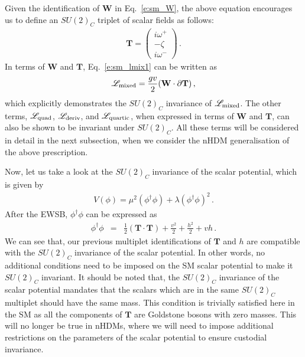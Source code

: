 \documentclass[11pt]{article}
\begin{document}
%
Given the identification of $\mathbf{W}$ in Eq.~\eqref{e:sm_W}, the above equation encourages us to define an $SU(2)_C$ triplet of scalar fields as follows:
%
\begin{eqnarray}
	\label{e:sm_T}
	\textbf{T}=\begin{pmatrix}
		i\omega^+\\-\zeta\\i\omega^-
	\end{pmatrix}\,.
\end{eqnarray}
%
In terms of $\mathbf{W}$ and $\mathbf{T}$, Eq.~\eqref{e:sm_lmix1} can be written as
%
\begin{eqnarray}
	\label{e:sm_lmix}
	\mathscr{L}_{\rm{mixed}}=\frac{g v}{2}(\textbf{W}\cdot \partial\textbf{T})\, ,
\end{eqnarray}
%
which explicitly demonstrates the $SU(2)_C$ invariance of $\mathscr{L}_{\rm mixed}$.  
The other terms, $\mathscr{L}_{\rm quad}$, $\mathscr{L}_{\rm deriv}$, and $\mathscr{L}_{\rm quartic}$, when expressed in terms of $\mathbf{W}$ and $\mathbf{T}$, can also be shown to be invariant under $SU(2)_C$.  
All these terms will be considered in detail in the next subsection, when we consider the nHDM generalisation of the above prescription.  

Now, let us take a look at the $SU(2)_C$ invariance of the scalar potential, which is given by
%
\begin{eqnarray}
	\label{e:sm_pot}
	V\left(\phi\right)=\mu^2\left(\phi^\dagger \phi\right)+\lambda\left(\phi^\dagger \phi\right)^2 \, .
\end{eqnarray}
%
After the EWSB, $\phi^\dagger \phi$ can be expressed as 
%
\begin{eqnarray}
	\label{e:sm_pot1}
	\phi^\dagger \phi&=&\frac{1}{2}(\mathbf{T}\cdot\mathbf{T})+\frac{v^2}{2}+\frac{h^2}{2}+vh\,.
\end{eqnarray}
%
We can see that, our previous multiplet identifications of $\textbf{T}$ and $h$ are compatible with the $SU(2)_C$ invariance of the scalar potential.  
In other words, no additional conditions need to be imposed on the SM scalar potential to make it $SU(2)_C$ invariant.  
It should be noted that, the $SU(2)_C$ invariance of the scalar potential mandates that the scalars which are in the same $SU(2)_C$ multiplet should have the same mass.  
This condition is trivially satisfied here in the SM as all the components of $\mathbf{T}$ are Goldstone bosons with zero masses.  
This will no longer be true in nHDMs, where we will need to impose additional restrictions on the parameters of the scalar potential to ensure custodial invariance.  
\end{document}
